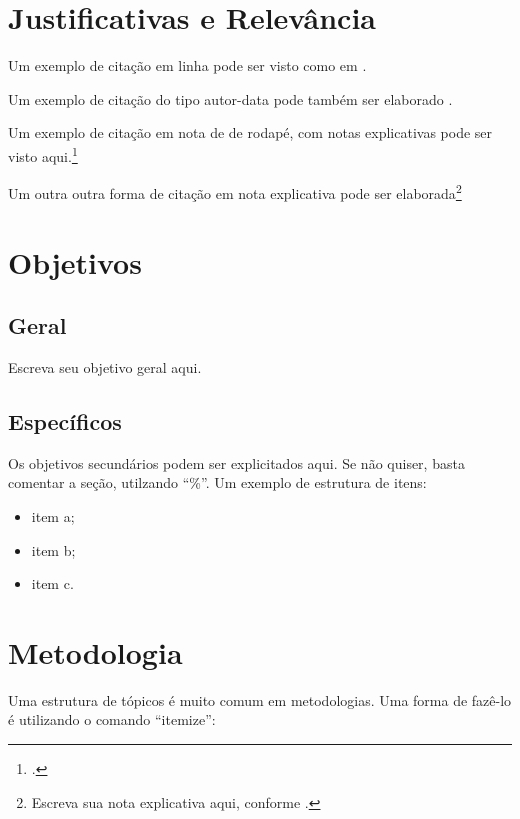 \documentclass[
	12pt,				%
	openright,			%
	oneside,			%
	a4paper,			%
	english,			%
	brazil				%
	]{abntex2}
\begin{document}
\section{Justificativas e Relevância}

Um exemplo de citação em linha pode ser visto como em \textcite{Einstein1920}.

Um exemplo de citação do tipo autor-data pode também ser elaborado \cite{Einstein1920}.

Um exemplo de citação em nota de de rodapé, com notas explicativas pode ser visto aqui.\footcite[Esta nota vem antes.][p.~22]{descartes-carta-mersene}

Um outra outra forma de citação em nota explicativa pode ser elaborada\footnote{Escreva sua nota explicativa aqui, conforme \textcite{boyle1772}.}

\section{Objetivos}

\subsection*{Geral}
Escreva seu objetivo geral aqui. 
\subsection*{Específicos}
Os objetivos secundários podem ser explicitados aqui. Se não quiser, basta comentar a seção, utilzando ``\%''. Um exemplo de estrutura de itens: 

\begin{itemize}
	\item item a;
	\item item b;
	\item item c.
\end{itemize}

%

\section{Metodologia}
Uma estrutura de tópicos é muito comum em metodologias. Uma forma de fazê-lo é utilizando o comando ``itemize'':
\end{document}
